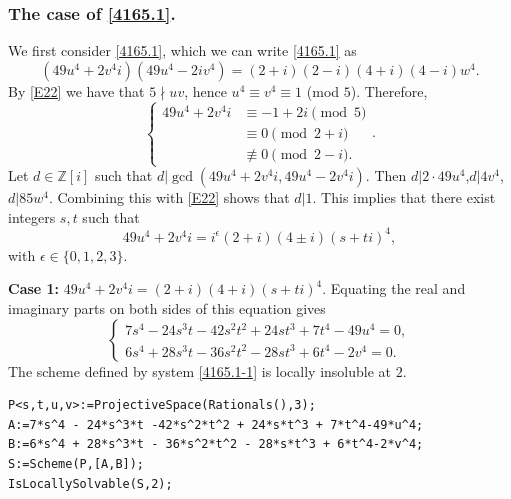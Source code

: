 \documentclass[a4paper,12pt,english,reqno]{amsart}
\newcommand{\Z}{{\mathbb Z}}
\begin{document}
\subsubsection{The case of \eqref{4165.1}.}
We first consider \eqref{4165.1}, which we can write \eqref{4165.1} as 
\begin{equation}\label{4165-1} (49u^4+2v^4i)(49u^4-2iv^4)=(2+i)(2-i)(4+i)(4-i)w^4.
\end{equation}
By \eqref{E22} we have that $5\nmid uv$, hence $u^4\equiv v^4\equiv 1$ (mod $5$). Therefore, \[\begin{cases}49u^4+2v^4i&\equiv -1+2i\pmod{5}\\
&\equiv 0\pmod{2+i}\\
&\not\equiv 0\pmod{2-i}.
\end{cases}.\]
Let $d\in \Z[i]$ such that $d|\gcd(49u^4+2v^4i,49u^4-2v^4i)$. Then $d|2\cdot 49u^4$,$d|4v^4$, $d|85w^4$. Combining this with \eqref{E22} shows that  $d|1$. This implies that there exist integers $s,t$ such that 
\[49u^4+2v^4i=i^{\epsilon}(2+i)(4\pm i)(s+ti)^4,\]
with $\epsilon\in \{0,1,2,3\}$.

{\bf Case 1:} $49u^4+2v^4i=(2+i)(4+i)(s+ti)^4$.  Equating the real and imaginary parts on both sides of this equation gives
\begin{equation}\label{4165.1-1}
\begin{cases}
7s^4 - 24s^3t - 42s^2t^2 + 24st^3 + 7t^4 - 49u^4=0,\\
6s^4 + 28s^3t - 36s^2t^2 - 28st^3 + 6t^4 - 2v^4=0.
\end{cases}
\end{equation}
The scheme defined by system \eqref{4165.1-1} is locally insoluble at $2$.


\begin{lstlisting}
P<s,t,u,v>:=ProjectiveSpace(Rationals(),3);
A:=7*s^4 - 24*s^3*t -42*s^2*t^2 + 24*s*t^3 + 7*t^4-49*u^4;
B:=6*s^4 + 28*s^3*t - 36*s^2*t^2 - 28*s*t^3 + 6*t^4-2*v^4;
S:=Scheme(P,[A,B]);
IsLocallySolvable(S,2);
\end{lstlisting}
\end{document}
